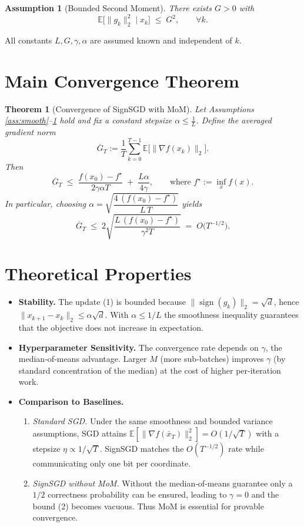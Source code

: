 \documentclass{article}
\newtheorem{theorem}{Theorem}
\newtheorem{assumption}{Assumption}
\newcommand{\sign}{\operatorname{sign}}
\newcommand{\EE}{\mathbb{E}}
\begin{document}
\begin{assumption}[Bounded Second Moment]\label{ass:bounded}
There exists $G>0$ with
\[
\EE\!\bigl[\|g_{k}\|_{2}^{2}\mid x_{k}\bigr]\;\le\; G^{2},\qquad\forall k.
\]
\end{assumption}

All constants $L,G,\gamma,\alpha$ are assumed known and independent of $k$.

\section*{Main Convergence Theorem}
\begin{theorem}[Convergence of SignSGD with MoM]\label{thm:main}
Let Assumptions \ref{ass:smooth}–\ref{ass:bounded} hold and fix a constant stepsize $\alpha\le \frac{1}{L}$.  
Define the averaged gradient norm
\[
\overline{G}_{T}:=\frac{1}{T}\sum_{k=0}^{T-1}\EE\!\bigl[\|\nabla f(x_{k})\|_{2}\bigr].
\]
Then
\begin{equation}
\overline{G}_{T}\;\le\;
\frac{f(x_{0})-f^{\star}}{2\gamma\alpha T}
\;+\;
\frac{L\alpha}{4\gamma},
\qquad\text{where }f^{\star}:=\inf_{x}f(x).
\tag{2}
\end{equation}
In particular, choosing $\alpha = \sqrt{\dfrac{4\,(f(x_{0})-f^{\star})}{L\,T}}$ yields
\[
\overline{G}_{T}\;\le\; 2\sqrt{\frac{L\,(f(x_{0})-f^{\star})}{\gamma^{2}T}}\;=\;O\!\bigl(T^{-1/2}\bigr).
\]
\end{theorem}

\section*{Theoretical Properties}
\begin{itemize}
\item \textbf{Stability.} The update (1) is bounded because $ \| \sign(g_{k})\|_{2}= \sqrt{d}$, hence $ \|x_{k+1}-x_{k}\|_{2}\le\alpha\sqrt{d}$.  With $\alpha\le 1/L$ the smoothness inequality guarantees that the objective does not increase in expectation.
\item \textbf{Hyperparameter Sensitivity.} The convergence rate depends on $\gamma$, the median‑of‑means advantage. Larger $M$ (more sub‑batches) improves $\gamma$ (by standard concentration of the median) at the cost of higher per‑iteration work.
\item \textbf{Comparison to Baselines.}
    \begin{enumerate}
        \item \emph{Standard SGD.} Under the same smoothness and bounded variance assumptions, SGD attains $\EE[\|\nabla f(\bar{x}_{T})\|_{2}^{2}]=O(1/\sqrt{T})$ with a stepsize $\eta\propto 1/\sqrt{T}$.  SignSGD matches the $O(T^{-1/2})$ rate while communicating only one bit per coordinate.
        \item \emph{SignSGD without MoM.} Without the median‑of‑means guarantee only a $1/2$ correctness probability can be ensured, leading to $\gamma=0$ and the bound (2) becomes vacuous.  Thus MoM is essential for provable convergence.
    \end{enumerate}
\end{itemize}
\end{document}
